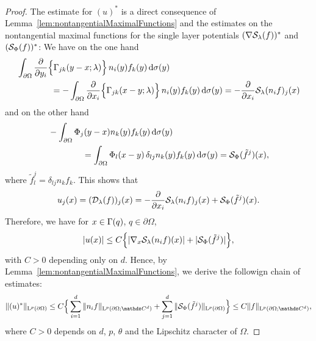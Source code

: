 \begin{proof}
  The estimate for $(u)^*$ is a direct consequence of Lemma~\ref{lem:nontangentialMaximalFunctions} and the estimates on the nontangential maximal functions for the single layer potentials $(\nabla \mathcal{S}_\lambda(f))^*$ and $(\mathcal{S}_\Phi(f))^*$:
  We have on the one hand
  \begin{align}
    \label{eq:rep1}
    \begin{alignedat}{1}
    &\int_{\partial\Omega} \frac{\partial}{\partial y_i} \Big\{ \Gamma_{jk}(y - x; \lambda) \Big\} \, n_i(y) f_k(y) \, {\operatorname{d}\!{\sigma}}(y) \\
    &\qquad\qquad= -\int_{\partial\Omega} \frac{\partial}{\partial x_i} \Big\{ \Gamma_{jk}(x - y; \lambda) \Big\}\, n_i(y) f_k(y) \, {\operatorname{d}\!{\sigma}}(y)
    = -\frac{\partial}{\partial x_i} \mathcal{S}_\lambda(n_i f)_j(x)
    \end{alignedat}
  \end{align}
  and on the other hand
  \begin{align}
    \label{eq:rep2}
    \begin{alignedat}{1}
    &-\int_{\partial\Omega} \Phi_j(y - x) n_k(y) f_k(y) \, {\operatorname{d}\!{\sigma}}(y) \\
    &\qquad\qquad= \int_{\partial\Omega} \Phi_l(x - y)\, \delta_{lj} n_k(y) f_k(y) \, {\operatorname{d}\!{\sigma}}(y)
    = \mathcal{S}_\Phi(\tilde f^j)(x), 
    \end{alignedat}
  \end{align}
  where $\tilde f^j_l = \delta_{lj} n_k f_k$.
  This shows that
  \begin{align*}
    u_j(x) = (\mathcal{D}_\lambda(f))_j(x) = -\frac{\partial}{\partial x_i} \mathcal{S}_\lambda(n_i f)_j(x) + \mathcal{S}_\Phi(\tilde f^j)(x).
  \end{align*}
  Therefore, we have for $x \in \Gamma(q)$, $q \in \partial\Omega$,
  \begin{align*}
    |u(x)| \leq C \Big\{ |\nabla_x \mathcal{S}_\lambda(n_i f)(x)| + |\mathcal{S}_\Phi(\tilde f^j) | \Big\}, 
  \end{align*}
  with $C > 0$ depending only on $d$.
  Hence, by Lemma~\ref{lem:nontangentialMaximalFunctions}, we derive the followign chain of estimates:
  \begin{align*}
    \| (u)^* \|_{\Ell^p(\partial\Omega)} 
    \leq C \Big\{ \sum_{i = 1}^d \| n_i f \|_{\Ell^p(\partial\Omega; \C^d)} + \sum_{j = 1}^d \| \slp_\Phi(\tilde f^j) \|_{\Ell^p(\partial\Omega)}\Big\} 
    \leq C \|f\|_{\Ell^p(\partial\Omega; \C^d)},
  \end{align*}
  where $C > 0$ depends on $d$, $p$, $\theta$ and the Lipschitz character of $\Omega$.


\end{proof}
